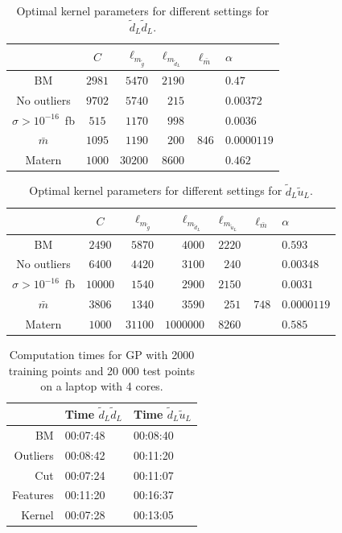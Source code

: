 \documentclass[twoside,english]{uiofysmaster}
\begin{document}
\begin{table}
\centering
\begin{tabular}{c|c|r|r|r|l}
 & $C$ & $\ell_{m_{\tilde{g}}}$ & $\ell_{m_{\tilde{d}_L}}$ & $\ell_{\bar{m}}$ & $\alpha$\\
 \hline
BM & $2981$ & $5470 $& $ 2190$ & & $0.47$\\
No outliers & $9702 $ & $5740$ & $215$ & & $0.00372$\\
$\sigma > 10^{-16}$~fb & $515$ & $1170$&  $998$ && $0.0036$\\
$\bar{m}$ & $1095$ & $1190$ & $200$ & $846$ & $0.0000119$\\
Matern & $1000$ & $30200$ & $8600$ && $0.462$\\
\end{tabular}
\caption{Optimal kernel parameters for different settings for $\tilde{d}_L \tilde{d}_L$.}
\label{Tab:: evaluating cross : optimal kernels dLdL}
\end{table}

\begin{table}
\centering
\begin{tabular}{c|c|r|r|r|r|l}
 & $C$ & $\ell_{m_{\tilde{g}}}$ & $\ell_{m_{\tilde{d}_L}}$ & $\ell_{m_{\tilde{u}_L}}$ & $\ell_{\bar{m}}$ &$\alpha$\\
 \hline
BM & $2490$ & $5870$&$ 4000$&$ 2220$ && $0.593$ \\
No outliers & $6400$ & $4420$ & $3100$ & $240$ && $0.00348$\\ 
$\sigma > 10^{-16}$~fb & $10000$ & $1540$ & $2900$ & $2150$ && $0.0031$\\
$\bar{m}$ &  $3806$ & $1340$ & $3590$ & $251$ & $748$ & $0.0000119$\\
Matern & $1000$ & $31100$ & $1000000$ & $8260$ && $0.585$\\
\end{tabular}
\caption{Optimal kernel parameters for different settings for $\tilde{d}_L \tilde{u}_L$.}
\label{Tab:: evaluating cross : optimal kernels dLuL}
\end{table}

 
\begin{table}
\centering
\begin{tabular}{r|l|l}
& Time $\tilde{d}_L \tilde{d}_L$ & Time $\tilde{d}_L \tilde{u}_L$\\
\hline
BM & 00:07:48 & 00:08:40\\
Outliers & 00:08:42 & 00:11:20\\
Cut & 00:07:24 & 00:11:07\\
Features & 00:11:20 & 00:16:37\\
Kernel & 00:07:28 & 00:13:05
\end{tabular}
\caption{Computation times for GP with 2000 training points and 20 000 test points on a laptop with 4 cores.}
\label{Tab:: evaluating cross : computation times BM}
\end{table}
\end{document}
